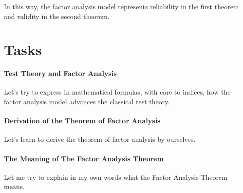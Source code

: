 \documentclass{ltjsbook}
\begin{document}
In this way, the factor analysis model represents reliability in the first theorem and validity in the second theorem.

\section{Tasks}
\paragraph{Test Theory and Factor Analysis} Let's try to express in mathematical formulas, with care to indices, how the factor analysis model advances the classical test theory.
\paragraph{Derivation of the Theorem of Factor Analysis} Let's learn to derive the theorem of factor analysis by ourselves.
\paragraph{The Meaning of The Factor Analysis Theorem} Let me try to explain in my own words what the Factor Analysis Theorem means.
\end{document}
